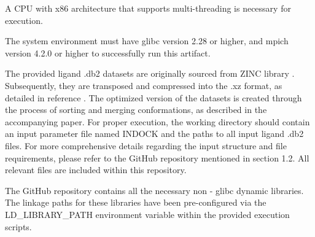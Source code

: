 \documentclass[nonacm,sigconf]{acmart}
\begin{document}

\artin

A CPU with x86 architecture that supports multi-threading is necessary for execution.


 The system environment must have glibc version 2.28 or higher, and mpich version 4.2.0 or higher to successfully run this artifact.


The provided ligand .db2 datasets are originally sourced from ZINC library \cite{irwin2012zinc, sterling2015zinc}. Subsequently, they are transposed and compressed into the .xz format, as detailed in reference \cite{xu2022redesigning}. The optimized version of the datasets is created through the process of sorting and merging conformations, as described in the accompanying paper.
For proper execution, the working directory should contain an input parameter file named INDOCK and the paths to all input ligand .db2 files. For more comprehensive details regarding the input structure and file requirements, please refer to the GitHub repository mentioned in section 1.2. All relevant files are included within this repository.

 The GitHub repository contains all the necessary non - glibc dynamic libraries. The linkage paths for these libraries have been pre-configured via the LD\_LIBRARY\_PATH environment variable within the provided execution scripts.

\end{document}
